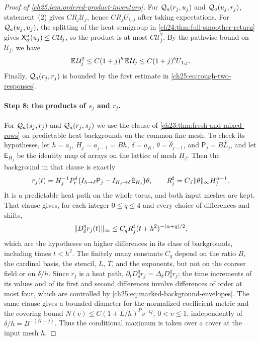 \begin{proof}[Proof of \cref{ch25:lem:ordered-product-inventory}]
For $\mathcal Q_{a}(r_j,u_j)$ and $\mathcal Q_{a}(u_j,r_j)$, statement~(2) gives $CR_j\mathcal U_j$, hence $CR_jU_{1,j}$ after taking expectations. For $\mathcal Q_{a}(u_j,u_j)$, the splitting of the heat semigroup in \cref{ch24:thm:full-smoother-return} gives $\mathsf X_{\alpha}^{a}(u_j)\le C\mathcal U_j$, so the product is at most $C\mathcal U_j^2$. By the pathwise bound on $\mathcal U_j$, we have
\[
 \mathbb E\,\mathcal U_j^2\le C(1+j)^b\,\mathbb E\,\mathcal U_j\le C(1+j)^bU_{1,j}.
\]
Finally, $\mathcal Q_{a}(r_j,r_j)$ is bounded by the first estimate in \eqref{ch25:eq:rough-two-responses}.

\paragraph{Step 8: the products of $s_j$ and $r_j$.}
For $\mathcal Q_{a}(s_j,r_j)$ and $\mathcal Q_{a}(r_j,s_j)$ we use the clause of \cref{ch23:thm:fresh-and-mixed-rows} on predictable heat backgrounds on the common fine mesh. To check its hypotheses, let $h=a_j$, $H_j=a_{j-1}=Bh$, $\delta=a_K$, $\theta=\widehat\theta_{j-1}$, and $\mathsf P_j=B\widehat L_j$, and let $\mathsf E_{H_j}$ be the identity map of arrays on the lattice of mesh $H_j$. Then the background in that clause is exactly
\begin{equation}\label{ch25:eq:marked-background-identification}
 r_j(t)=H_j^{-1}P_{t}^{\delta}\bigl(I_{h\to\delta}\mathsf P_j-I_{H_j\to\delta}\mathsf E_{H_j}\bigr)\theta,
 \qquad R_j^\sharp=C_J\lVert \theta\rVert_\infty H_j^{\alpha-1}.
\end{equation}
It is a predictable heat path on the whole torus, and both input meshes are kept. That clause gives, for each integer $0\le q\le4$ and every choice of differences and shifts,
\begin{equation}\label{ch25:eq:marked-background-envelopes}
 \lVert D_\delta^qr_j(t)\rVert_\infty\le C_qR_j^\sharp(t+h^2)^{-(\alpha+q)/2},
\end{equation}
which are the hypotheses on higher differences in its class of backgrounds, including times $t<h^2$. The finitely many constants $C_q$ depend on the ratio $B$, the cardinal basis, the stencil, $L$, $T$, and the exponents, but not on the coarser field or on $\delta/h$. Since $r_j$ is a heat path, $\partial_tD_\delta^qr_j=\Delta_\delta D_\delta^qr_j$; the time increments of its values and of its first and second differences involve differences of order at most four, which are controlled by \eqref{ch25:eq:marked-background-envelopes}. The same clause gives a bounded diameter for the normalized coefficient metric and the covering bound $N(v)\le C(1+L/h)^Pv^{-Q}$, $0<v\le1$, independently of $\delta/h=B^{-(K-j)}$. Thus the conditional maximum is taken over a cover at the input mesh $h$.


\end{proof}
